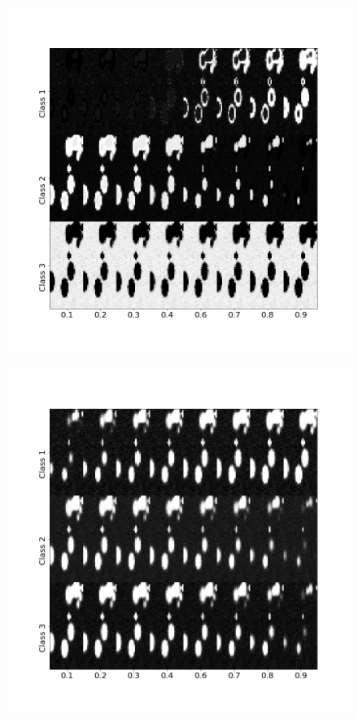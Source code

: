 \documentclass{article}
\begin{document}
\begin{figure}[!h]
  \includegraphics[width=1\linewidth]{figures_2/DNN_prop_im.png}
\end{figure}

\begin{figure}[!h]
  \includegraphics[width=1\linewidth]{figures_2/DNN_sigmoid_im.png}  
\end{figure}
\end{document}
